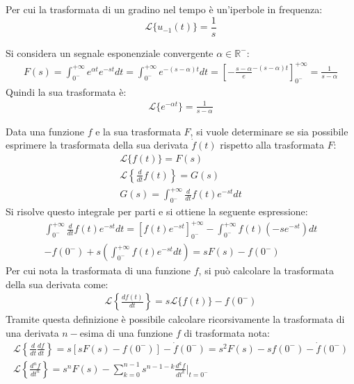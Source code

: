 \documentclass{article}
\numberwithin{equation}{subsection}
\begin{document}
Per cui la trasformata di un gradino nel tempo è un'iperbole in frequenza:
\begin{equation}
    \mathcal{L}\{u_{-1}(t)\}=\displaystyle\frac{1}{s}
\end{equation}

Si considera un segnale esponenziale convergente $\alpha\in\mathbb{R}^-$:
\begin{gather*}
    F(s)=\displaystyle\int_{0^-}^{+\infty}e^{\alpha t}e^{-st}dt=\int_{0^-}^{+\infty}e^{-(s-\alpha)t}dt=\left[-\frac{s-\alpha}e^{-(s-\alpha)t}\right]^{+\infty}_{0^-}=\frac{1}{s-\alpha}
\end{gather*}
Quindi la sua trasformata è:
\begin{gather}
    \mathcal{L}\{e^{-\alpha t}\}=\displaystyle\frac{1}{s-\alpha}
\end{gather}


Data una funzione $f$ e la sua trasformata $F$, si vuole determinare se sia possibile esprimere la trasformata della sua derivata $\dot f(t)$ rispetto alla trasformata $F$:
\begin{gather*}
    \mathcal{L}\{f(t)\}=F(s)\\
    \mathcal{L}\left\{\displaystyle\frac{d}{dt}f(t)\right\}=G(s)\\
    G(s)=\displaystyle\int_{0^-}^{+\infty}\frac{d}{dt}f(t)e^{-st}dt
\end{gather*}
Si risolve questo integrale per parti e si ottiene la seguente espressione:
\begin{gather*}
    \displaystyle\int_{0^-}^{+\infty}\frac{d}{dt}f(t)e^{-st}dt=\left[f(t)e^{-st}\right]^{+\infty}_{0^-}-\int_{0^-}^{+\infty}f(t)(-se^{-st})dt\\
    \displaystyle-f(0^-)+s\left(\int_{0^-}^{+\infty}f(t)e^{-st}dt\right)=sF(s)-f(0^-) 
\end{gather*}
Per cui nota la trasformata di una funzione $f$, si può calcolare la trasformata della sua derivata come:
\begin{gather}
    \mathcal{L}\left\{\displaystyle\frac{df(t)}{dt}\right\}=s\mathcal{L}\{f(t)\}-f(0^-)
\end{gather}
Tramite questa definizione è possibile calcolare ricorsivamente la trasformata di una derivata $n-$esima di una funzione $f$ di trasformata nota:
\begin{gather*}
    \mathcal{L}\left\{\displaystyle\frac{d}{dt}\frac{df}{dt}\right\}=s\left[sF(s)-f(0^-)\right]-\dot f(0^-)=s^2F(s)-sf(0^-)-\dot f(0^-)\\
    \mathcal{L}\left\{\displaystyle\frac{d^nf}{dt^n}\right\}=s^nF(s)-\sum_{k=0}^{n-1}s^{n-1-k}\frac{d^kf}{dt^k}\Bigg|_{t=0^-}
\end{gather*}
\end{document}
